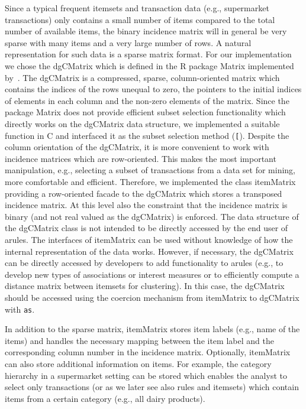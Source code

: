 \documentclass[10pt,a4paper]{article}
\newcommand{\strong}[1]{{\normalfont\fontseries{b}\selectfont #1}}
\newcommand{\class}[1]{\textsf{#1}}
\newcommand{\code}[1]{\texttt{#1}}
\newcommand{\pkg}[1]{\strong{#1}}
\newcommand{\proglang}[1]{\textsf{#1}}
\begin{document}
Since a typical frequent itemsets and transaction data 
(e.g., supermarket transactions) only contains a small number of
items compared to the total number of available items, the
binary incidence matrix will
in general be very sparse with many items and a very large number of
rows.  A natural representation for such data is a sparse matrix
format.  For our implementation we chose the \class{dgCMatrix} which is
defined in the \proglang{R} package \pkg{Matrix} 
implemented by~\cite{arules:Bates+Maechler:2005}. The \class{dgCMatrix}
is a compressed, sparse, column-oriented matrix which contains the
indices of the rows unequal to zero, the pointers to the initial indices
of elements in each column and the non-zero elements of the matrix.
Since the package \pkg{Matrix} does not provide efficient subset selection
functionality which directly works on the \class{dgCMatrix} data structure, 
we implemented a suitable function
in \proglang{C} and interfaced it as the subset selection method (\code{[}).
Despite the column orientation of the \class{dgCMatrix}, it is more
convenient to work with incidence matrices which are row-oriented.  This
makes the most important manipulation, e.g., selecting a subset of transactions
from a data set for mining, more comfortable and efficient.  Therefore,
we implemented the class \class{itemMatrix} providing a row-oriented
facade to the \class{dgCMatrix} which stores a transposed incidence
matrix.  At this level also the constraint that the incidence matrix is
binary (and not real valued as the \class{dgCMatrix}) is enforced.
The data structure of the \class{dgCMatrix} class is not intended to 
be directly accessed by the end user of \pkg{arules}. The interfaces of
\class{itemMatrix} can be used without
knowledge of how the internal representation of the data works.
However, if necessary, the \class{dgCMatrix} can be directly accessed 
by developers to add functionality to \pkg{arules} 
(e.g., to develop new types of associations or interest measures or to
efficiently compute a distance matrix between itemsets for clustering).
In this case, the \class{dgCMatrix} should be accessed using the 
coercion mechanism from \class{itemMatrix} to \class{dgCMatrix} with \code{as}.

In addition to the sparse matrix,
\class{itemMatrix} stores item labels (e.g., name
of the items) and handles the necessary mapping between the item label and the
corresponding column number in the incidence matrix.  Optionally,
\class{itemMatrix} can also store additional information on items. For
example, the category hierarchy in a supermarket setting can be stored which
enables the analyst to select only transactions (or as we later see also rules
and itemsets) which contain items from a certain category (e.g., all dairy
products). 
\end{document}
